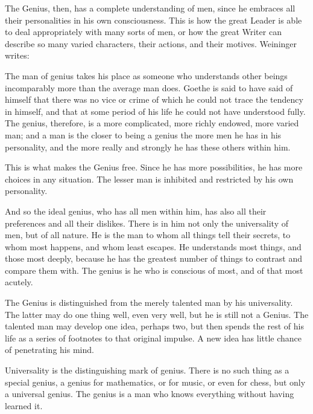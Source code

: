 The Genius, then, has a complete understanding of men, since he embraces all their personalities in his own consciousness. This is how the great Leader is able to deal appropriately with many sorts of men, or how the great Writer can describe so many varied characters, their actions, and their motives. Weininger writes:

\begin{quotex}
The man of genius takes his place as someone who understands other beings incomparably more than the average man does. Goethe is said to have said of himself that there was no vice or crime of which he could not trace the tendency in himself, and that at some period of his life he could not have understood fully. The genius, therefore, is a more complicated, more richly endowed, more varied man; and a man is the closer to being a genius the more men he has in his personality, and the more really and strongly he has these others within him. 

\end{quotex}
This is what makes the Genius free. Since he has more possibilities, he has more choices in any situation. The lesser man is inhibited and restricted by his own personality.

\begin{quotex}
And so the ideal genius, who has all men within him, has also all their preferences and all their dislikes. There is in him not only the universality of men, but of all nature. He is the man to whom all things tell their secrets, to whom most happens, and whom least escapes. He understands most things, and those most deeply, because he has the greatest number of things to contrast and compare them with. The genius is he who is conscious of most, and of that most acutely. 

\end{quotex}
The Genius is distinguished from the merely talented man by his universality. The latter may do one thing well, even very well, but he is still not a Genius. The talented man may develop one idea, perhaps two, but then spends the rest of his life as a series of footnotes to that original impulse. A new idea has little chance of penetrating his mind.

\begin{quotex}
Universality is the distinguishing mark of genius. There is no such thing as a special genius, a genius for mathematics, or for music, or even for chess, but only a universal genius. The genius is a man who knows everything without having learned it. 

\end{quotex}

